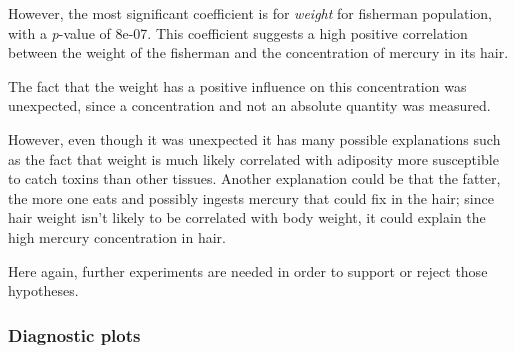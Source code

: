 \documentclass[12pt,]{article}
\begin{document}
However, the most significant coefficient is for \emph{weight} for
fisherman population, with a \emph{p}-value of 8e-07. This coefficient
suggests a high positive correlation between the weight of the fisherman
and the concentration of mercury in its hair.

The fact that the weight has a positive influence on this concentration
was unexpected, since a concentration and not an absolute quantity was
measured.

However, even though it was unexpected it has many possible explanations
such as the fact that weight is much likely correlated with adiposity
more susceptible to catch toxins than other tissues. Another explanation
could be that the fatter, the more one eats and possibly ingests mercury
that could fix in the hair; since hair weight isn't likely to be
correlated with body weight, it could explain the high mercury
concentration in hair.

Here again, further experiments are needed in order to support or reject
those hypotheses.

\subsubsection{Diagnostic plots}\label{diagnostic-plots}
\end{document}
